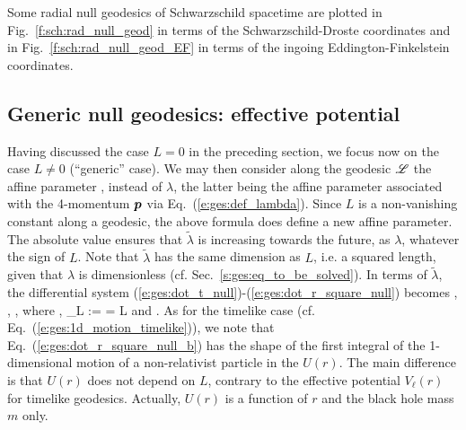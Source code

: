 Some radial null geodesics of Schwarzschild spacetime are plotted in
Fig.~\ref{f:sch:rad_null_geod} in terms of the Schwarzschild-Droste coordinates
and in Fig.~\ref{f:sch:rad_null_geod_EF} in terms of the ingoing Eddington-Finkelstein coordinates.



\subsection{Generic null geodesics: effective potential}
\label{s:ges:null_eff_pot}

Having discussed the case $L=0$ in the preceding section, we focus now on the
case $L\not= 0$ (``generic'' case). We may then
consider along the geodesic $\mathscr{L}$ the affine parameter
\be
   ,
\ee
instead of $\lambda$, the latter being the affine parameter associated with the 4-momentum $\bm{p}$
via Eq.~(\ref{e:ges:def_lambda}).
Since $L$ is a non-vanishing constant along a geodesic, the above formula
does define a new affine parameter. The absolute value ensures that
$\tilde{\lambda}$ is increasing towards the future, as $\lambda$, whatever
the sign of $L$. Note that $\tilde{\lambda}$ has the same
dimension as $L$, i.e. a squared length, given that $\lambda$ is dimensionless
(cf. Sec.~\ref{s:ges:eq_to_be_solved}).
In terms of $\tilde{\lambda}$,
the differential system (\ref{e:ges:dot_t_null})-(\ref{e:ges:dot_r_square_null})
becomes
\be \label{e:ges:dot_t_null_b}
   ,
\ee
\be \label{e:ges:dot_ph_null_b}
    ,
\ee
\be \label{e:ges:dot_r_square_null_b}
   ,
\ee
where
\be \label{e:ges:def_b}
     ,
\ee
\be \label{e:gis:def_epsilon_L}
    \eps_L :=  =  L
\ee
and
\be \label{e:ges:eff_pot_null}
    .
\ee
As for the timelike case (cf. Eq.~(\ref{e:ges:1d_motion_timelike})),
we note that Eq.~(\ref{e:ges:dot_r_square_null_b})
has the shape of the first integral of the
1-dimensional motion of a non-relativist particle in the
$U(r)$. The main difference is that $U(r)$ does not depend on $L$, contrary
to the effective potential $V_\ell(r)$ for timelike geodesics. Actually,
$U(r)$ is a function of $r$ and the black hole mass $m$ only.
